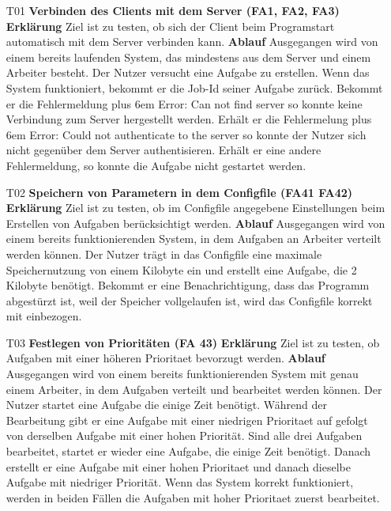 \documentclass[a4paper,12pt]{article}
\makeatletter
\newenvironment{mycode}
 {\def\@xobeysp{\ }\verbatim\rightskip=0pt plus 6em\relax}
 {\endverbatim}
\makeatother
\begin{document}
\begin{itemize}
\item[T01] \textbf{Verbinden des Clients mit dem Server (FA1, FA2, FA3)}
\subitem \textbf{Erklärung} Ziel ist zu testen, ob sich der Client beim Programstart automatisch mit dem Server verbinden kann.
\subitem \textbf{Ablauf} Ausgegangen wird von einem bereits laufenden System, das mindestens aus dem Server und einem Arbeiter besteht.
Der Nutzer versucht eine Aufgabe zu erstellen.
Wenn das System funktioniert, bekommt er die Job-Id seiner Aufgabe zurück.
Bekommt er die Fehlermeldung
\begin{mycode}
Error: Can not find server
\end{mycode}
so konnte keine Verbindung zum Server hergestellt werden. Erhält er die Fehlermelung
\begin{mycode}
Error: Could not authenticate to the server
\end{mycode}
so konnte der Nutzer sich nicht gegenüber dem Server authentisieren. Erhält er eine andere Fehlermeldung, so konnte die Aufgabe nicht gestartet werden.

\item[T02] \textbf{Speichern von Parametern in dem \gls{Configfile} (FA41 FA42)}
\subitem \textbf{Erklärung} Ziel ist zu testen, ob im \gls{Configfile} angegebene Einstellungen beim Erstellen von Aufgaben berücksichtigt werden.
\subitem \textbf{Ablauf} Ausgegangen wird von einem bereits funktionierenden System, in dem Aufgaben an Arbeiter verteilt werden können.
Der Nutzer trägt in das \gls{Configfile} eine maximale Speichernutzung von einem Kilobyte ein und erstellt eine Aufgabe, die 2 Kilobyte benötigt.
Bekommt er eine Benachrichtigung, dass das Programm abgestürzt ist, weil der Speicher vollgelaufen ist, wird das \gls{Configfile} korrekt mit einbezogen.

\item[T03] \textbf{Festlegen von Prioritäten (FA 43)}
\subitem \textbf{Erklärung} Ziel ist zu testen, ob Aufgaben mit einer höheren \gls{Prioritaet} bevorzugt werden.
\subitem \textbf{Ablauf} Ausgegangen wird von einem bereits funktionierenden System mit genau einem Arbeiter, in dem Aufgaben verteilt und bearbeitet werden können.
Der Nutzer startet eine Aufgabe die einige Zeit benötigt. Während der Bearbeitung gibt er eine Aufgabe mit einer niedrigen \gls{Prioritaet} auf gefolgt von derselben Aufgabe mit einer hohen Priorität.
Sind alle drei Aufgaben bearbeitet, startet er wieder eine Aufgabe, die einige Zeit benötigt. Danach erstellt er eine Aufgabe mit einer hohen \gls{Prioritaet} und danach dieselbe Aufgabe mit niedriger Priorität.
Wenn das System korrekt funktioniert, werden in beiden Fällen die Aufgaben mit hoher \gls{Prioritaet} zuerst bearbeitet.


\end{itemize}
\end{document}
